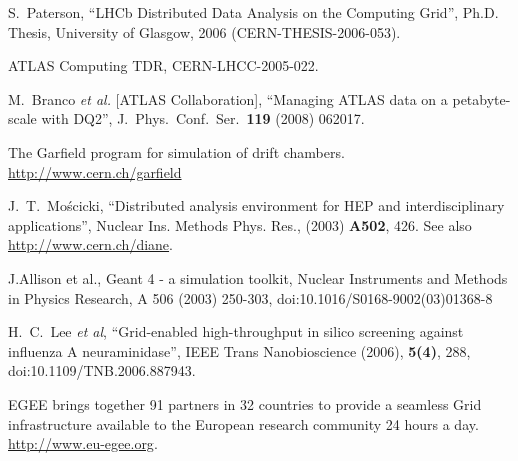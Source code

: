 \documentclass{elsart}
\begin{document}
\begin{thebibliography}{00}
  S.~Paterson, ``LHCb Distributed Data Analysis on the Computing Grid'', Ph.D.
  Thesis, University of Glasgow, 2006 (CERN-THESIS-2006-053).

  ATLAS Computing TDR, CERN-LHCC-2005-022.

 M.~Branco {\it et al.}  [ATLAS Collaboration],
 ``Managing ATLAS data on a petabyte-scale with DQ2'',
 J.\ Phys.\ Conf.\ Ser.\  {\bf 119} (2008) 062017.



  The Garfield program for simulation of drift chambers.
  \url{http://www.cern.ch/garfield}

 J.~T.~Mo{\'s}cicki, ``Distributed analysis environment for
  HEP and interdisciplinary applications'', Nuclear Ins. Methods Phys. Res.,
  (2003) {\bf A502}, 426. See also
  \url{http://www.cern.ch/diane}.

J.Allison et al., Geant 4 - a simulation toolkit, Nuclear Instruments 
and Methods in Physics Research,  A 506 (2003) 250-303, doi:10.1016/S0168-9002(03)01368-8 

  H.~C.~Lee {\it et al}, ``Grid-enabled high-throughput in silico screening
  against influenza A neuraminidase'', IEEE Trans Nanobioscience (2006), 
  {\bf 5(4)}, 288, doi:10.1109/TNB.2006.887943.

  EGEE brings together 91 partners in 32 countries to provide a seamless Grid
  infrastructure available to the European research community 24 hours a day.
  \url{http://www.eu-egee.org}.





\end{thebibliography}
\end{document}
